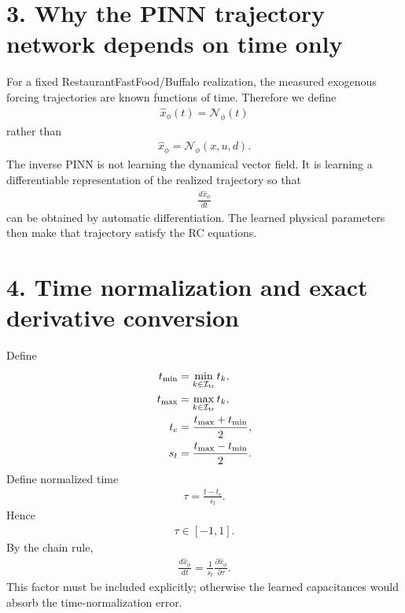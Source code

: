 \documentclass[11pt]{article}
\begin{document}
\section*{3. Why the PINN trajectory network depends on time only}
For a fixed RestaurantFastFood/Buffalo realization, the measured exogenous forcing trajectories are known functions of time. Therefore we define
\begin{align}
\boxed{\widehat x_\phi(t)=\mathcal N_\phi(t)}
\tag{P2.6}
\end{align}
rather than
\begin{align}
\widehat x_\phi=\mathcal N_\phi(x,u,d).
\end{align}
The inverse PINN is not learning the dynamical vector field. It is learning a differentiable representation of the realized trajectory so that
\begin{align}
\frac{d\widehat x_\phi}{dt}
\end{align}
can be obtained by automatic differentiation. The learned physical parameters then make that trajectory satisfy the RC equations.

\section*{4. Time normalization and exact derivative conversion}
Define
\begin{align}
t_{\min}&=\min_{k\in\mathcal I_{\rm tr}}t_k,\\
t_{\max}&=\max_{k\in\mathcal I_{\rm tr}}t_k,\\
t_c&=\frac{t_{\max}+t_{\min}}{2},\\
s_t&=\frac{t_{\max}-t_{\min}}{2}.
\end{align}
Define normalized time
\begin{align}
\boxed{\tau=\frac{t-t_c}{s_t}.}
\tag{P2.7}
\end{align}
Hence
\begin{align}
\tau\in[-1,1].
\end{align}
By the chain rule,
\begin{align}
\boxed{\frac{d\widehat x_\phi}{dt}=\frac{1}{s_t}\frac{\partial\widehat x_\phi}{\partial\tau}.}
\tag{P2.8}
\end{align}
This factor must be included explicitly; otherwise the learned capacitances would absorb the time-normalization error.
\end{document}

